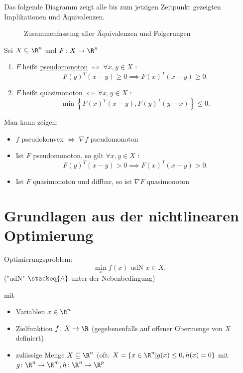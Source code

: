 \begin{folgerung}
	Das folgende Diagramm zeigt alle bis zum jetzigen Zeitpunkt gezeigten Implikationen und Äquivalenzen.

\label{thm:monotonefunktionenkonvexefunktionenfolgerung}
\begin{figure}[H]
	\begin{center}
		
	\end{center}
	\caption{Zusammenfassung aller Äquivalenzen und Folgerungen}
	\label{fig:ZusammenfassungKonvexUndMonoton}
\end{figure}

\end{folgerung}

\begin{definition}
\label{thm:pseudoquasimonoton}
	Sei $X \subseteq \R^{n}$ und $F \colon X \rightarrow \R^{n} $
	\begin{enumerate}[label=(\alph{enumi})]
		\item  $F$ heißt \underline{pseudomonoton} $\iff$ $\forall x,y \in X$ : 
			\[
				F(y)^{T}(x-y) \geq 0 \implies F(x)^{T}(x-y) \geq 0
			.\] 
		\item $F$ heißt \underline{quasimonoton} $\iff$ $\forall x,y \in X$ :
			\[
				\min \left\{ F(x)^{T}(x-y), F(y)^{T}(y-x) \right\} \leq 0
			.\] 
	\end{enumerate}

	Man kann zeigen:
	\begin{itemize}
		\item $f$ pseudokonvex $\iff$ $\nabla f$ pseudomonoton
		\item Ist $F$ pseudomonoton, so gilt $\forall x,y \in X$ :
			\[
				F(y)^{T} (x-y) > 0 \implies F(x)^{T} (x-y) > 0
			.\] 
		\item Ist $F$ quasimonoton und diffbar, so ist $\nabla F$ quasimonoton
	\end{itemize}
\end{definition}

\section{Grundlagen aus der nichtlinearen Optimierung}%
\label{sec:Grundlagen aus der nichtlinearen Optimierung}

Optimierungsproblem: 
\[
 \min\limits_{x} f(x) \text{ udN } x \in X
.\]
("udN" $\stackeq{\wedge}$ unter der Nebenbedingung)

mit
\begin{itemize}
	\item Variablen $x \in \R^{n}$
	\item Zielfunktion $f \colon X \rightarrow \R $ (gegebenenfalls auf offener Obermenge von $X$ definiert)
	\item zulässige Menge $X \subseteq \R^{n}$ (oft: $X = \left\{ x \in \R^{n} | g(x) \leq 0, h(x) = 0 \right\} $ mit $g \colon \R^{n} \rightarrow \R^{m}, h \colon \R^{n} \rightarrow \R^{p}$
\end{itemize}

